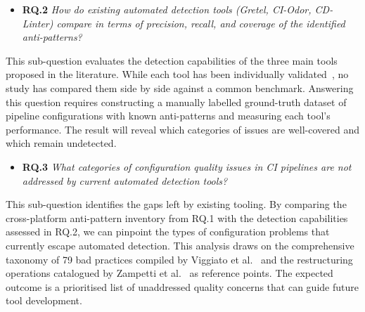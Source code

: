 \documentclass[a4paper,11pt,oneside]{article}
\begin{document}
\begin{itemize}
    \item \textbf{RQ.2} \emph{How do existing automated detection tools (Gretel, CI-Odor, CD-Linter) compare in terms of precision, recall, and coverage of the identified anti-patterns?}
\end{itemize}

This sub-question evaluates the detection capabilities of the three main tools proposed in the literature. While each tool has been individually validated~\cite{Gallaba2020, Vassallo2019, Vassallo2020}, no study has compared them side by side against a common benchmark. Answering this question requires constructing a manually labelled ground-truth dataset of pipeline configurations with known anti-patterns and measuring each tool's performance. The result will reveal which categories of issues are well-covered and which remain undetected.

\begin{itemize}
    \item \textbf{RQ.3} \emph{What categories of configuration quality issues in CI pipelines are not addressed by current automated detection tools?}
\end{itemize}

This sub-question identifies the gaps left by existing tooling. By comparing the cross-platform anti-pattern inventory from RQ.1 with the detection capabilities assessed in RQ.2, we can pinpoint the types of configuration problems that currently escape automated detection. This analysis draws on the comprehensive taxonomy of 79 bad practices compiled by Viggiato et al.~\cite{Viggiato2019} and the restructuring operations catalogued by Zampetti et al.~\cite{Zampetti2021} as reference points. The expected outcome is a prioritised list of unaddressed quality concerns that can guide future tool development.



\end{document}
